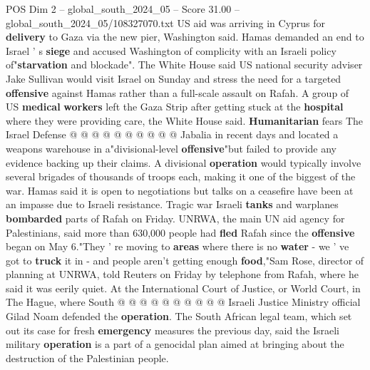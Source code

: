 \begin{textsample}{POS Dim 2 – global\_south\_2024\_05 – Score 31.00 – global\_south\_2024\_05/108327070.txt}
US aid was arriving in Cyprus for \textbf{delivery} to Gaza via the new pier, Washington said.
Hamas demanded an end to Israel ' s \textbf{siege} and accused Washington of complicity with an Israeli policy of"\textbf{starvation} and blockade".
The White House said US national security adviser Jake Sullivan would visit Israel on Sunday and stress the need for a targeted \textbf{offensive} against Hamas rather than a full-scale assault on Rafah.
A group of US \textbf{medical} \textbf{workers} left the Gaza Strip after getting stuck at the \textbf{hospital} where they were providing care, the White House said. \textbf{Humanitarian} fears The Israel Defense @ @ @ @ @ @ @ @ @ @ Jabalia in recent days and located a weapons warehouse in a"divisional-level \textbf{offensive}"but failed to provide any evidence backing up their claims.
A divisional \textbf{operation} would typically involve several brigades of thousands of troops each, making it one of the biggest of the war.
Hamas said it is open to negotiations but talks on a ceasefire have been at an impasse due to Israeli resistance.
Tragic war Israeli \textbf{tanks} and warplanes \textbf{bombarded} parts of Rafah on Friday.
UNRWA, the main UN aid agency for Palestinians, said more than 630,000 people had \textbf{fled} Rafah since the \textbf{offensive} began on May 6."They ' re moving to \textbf{areas} where there is no \textbf{water} - we ' ve got to \textbf{truck} it in - and people aren't getting enough \textbf{food},"Sam Rose, director of planning at UNRWA, told Reuters on Friday by telephone from Rafah, where he said it was eerily quiet.
At the International Court of Justice, or World Court, in The Hague, where South @ @ @ @ @ @ @ @ @ @ Israeli Justice Ministry official Gilad Noam defended the \textbf{operation}.
The South African legal team, which set out its case for fresh \textbf{emergency} measures the previous day, said the Israeli military \textbf{operation} is a part of a genocidal plan aimed at bringing about the destruction of the Palestinian people.

\end{textsample}
